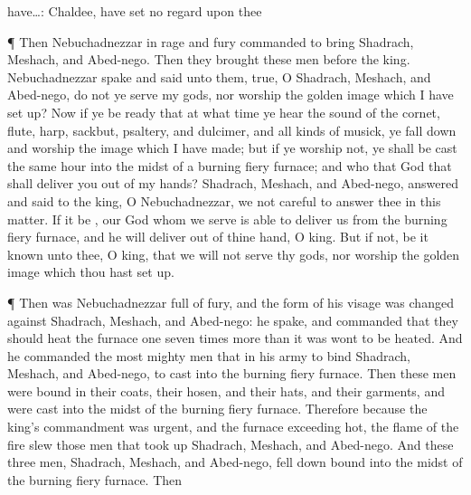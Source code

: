 {{have…: Chaldee, have set no regard upon thee}
\par }{\PP {}¶
Then
Nebuchadnezzar in
{}
rage and
fury
commanded to
bring
Shadrach,
Meshach, and
Abed-nego.
Then they
brought
these
men
before the
king.
Nebuchadnezzar
spake and
said unto them,
{}
true, O
Shadrach,
Meshach, and
Abed-nego, do
not
ye
serve my
gods,
nor
worship the
golden
image which I have
set up?
Now
if ye
be
ready that at what
time ye
hear the
sound of the
cornet,
flute,
harp,
sackbut,
psaltery, and
dulcimer, and
all
kinds of
musick, ye fall
down and
worship the
image which I have
made;
{} but
if ye
worship
not, ye shall be
cast the same
hour into the
midst of a
burning
fiery
furnace; and
who
{} that
God that shall
deliver you out
of my
hands?
Shadrach,
Meshach, and
Abed-nego,
answered and
said to the
king, O
Nebuchadnezzar,
we
{}
not
careful to
answer thee
in
this
matter.
If it be
{}, our
God whom
we
serve
is
able to
deliver us
from the
burning
fiery
furnace,
and he will
deliver
{} out
of thine
hand, O
king.
But
if
not, be
it
known unto thee, O
king, that we
will
not
serve thy
gods,
nor
worship the
golden
image which thou hast set
up.
\par }{\PP {}¶
Then was
Nebuchadnezzar
full of
fury, and the
form of his
visage was
changed
against
Shadrach,
Meshach, and
Abed-nego:
{} he
spake, and
commanded that they should
heat the
furnace
one seven
times
more
than it was
wont to be
heated.
And he
commanded the
most
mighty
men that
{} in his
army to
bind
Shadrach,
Meshach, and
Abed-nego,
{} to
cast
{} into the
burning
fiery
furnace.
Then
these
men were
bound in their
coats, their
hosen, and their
hats, and their
{}
garments, and were
cast into the
midst of the
burning
fiery
furnace.
Therefore
because the
king’s
commandment was
urgent, and the
furnace
exceeding
hot, the
flame of the
fire
slew
those
men that took
up
Shadrach,
Meshach, and
Abed-nego.
And
these
three
men,
Shadrach,
Meshach, and
Abed-nego, fell
down
bound into the
midst of the
burning
fiery
furnace.
Then
}
